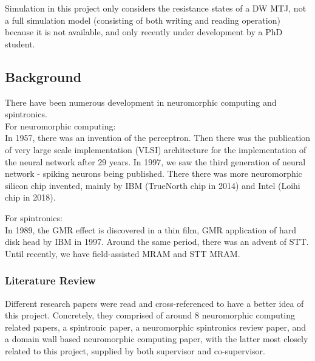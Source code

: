 Simulation in this project only considers the resistance states of a DW MTJ, not a full simulation model (consisting of both writing and reading operation) because it is not available, and only recently under development by a PhD student.
\subsection{Background}
There have been numerous development in neuromorphic computing and spintronics.\\
For neuromorphic computing:\\
In 1957, there was an invention of the perceptron. Then there was the publication of very large scale implementation (VLSI) architecture for the implementation of the neural network after 29 years. In 1997, we saw the third generation of neural network - spiking neurons being published. There there was more neuromorphic silicon chip invented, mainly by IBM (TrueNorth chip in 2014) and Intel (Loihi chip in 2018).

For spintronics:\\
In 1989, the GMR effect is discovered in a thin film, GMR application of hard disk head by IBM in 1997. Around the same period, there was an advent of STT. Until recently, we have field-assisted MRAM and STT MRAM.
\subsubsection{Literature Review}
Different research papers were read and cross-referenced to have a better idea of this project. Concretely, they comprised of around 8 neuromorphic computing related papers, a spintronic paper, a neuromorphic spintronics review paper, and a domain wall based neuromorphic computing paper, with the latter most closely related to this project, supplied by both supervisor and co-supervisor.

